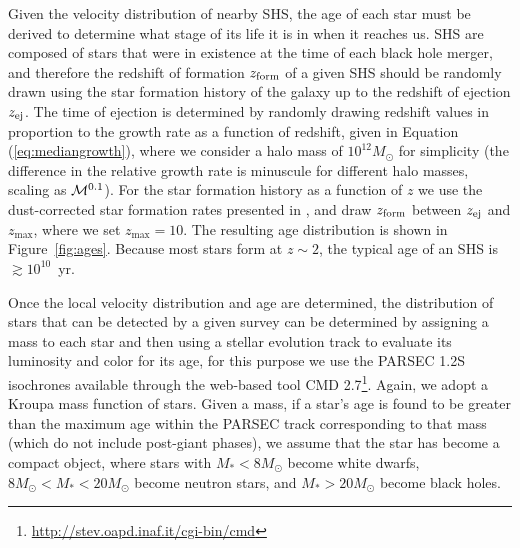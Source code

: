 \documentclass[a4paper,twocolumn]{emulateapj}
\begin{document}
{Given the velocity distribution of nearby SHS, the age of each star must be derived to determine what stage of its life it is in when it reaches us. SHS are composed of stars that were in existence at the time of each black hole merger, and therefore the redshift of formation $z_{\rm form}$ of a given SHS should be randomly drawn using the star formation history of the galaxy up to the redshift of ejection $z_{\rm ej}$. The time of ejection is determined by randomly drawing redshift values in proportion to the growth rate as a function of redshift, given in Equation (\ref{eq:mediangrowth}), where we consider a halo mass of $10^{12} M_{\odot}$ for simplicity (the difference in the relative growth rate is minuscule for different halo masses, scaling as ${\cal M}^{0.1}$). For the star formation history as a function of $z$ we use the dust-corrected star formation rates presented in \citet{Bouwens:2012a}, and draw $z_{\rm form}$ between $z_{\rm ej}$ and $z_{\max}$, where we set $z_{\max} = 10$. The resulting age distribution is shown in Figure~\ref{fig:ages}. Because most stars form at $z \sim 2$, the typical age of an SHS is $\gtrsim 10^{10}$~yr.

Once the local velocity distribution and age are determined, the distribution of stars that can be detected by a given survey can be determined by assigning a mass to each star and then using a stellar evolution track to evaluate its luminosity and color for its age, for this purpose we use the \mbox{PARSEC} 1.2S isochrones \citep{Bressan:2012a,Chen:2014a} available through the web-based tool CMD 2.7\footnote{\url{http://stev.oapd.inaf.it/cgi-bin/cmd}}. Again, we adopt a Kroupa mass function of stars. Given a mass, if a star's age is found to be greater than the maximum age within the PARSEC track corresponding to that mass (which do not include post-giant phases), we assume that the star has become a compact object, where stars with $M_{\ast} < 8 M_{\odot}$ become white dwarfs, $8 M_{\odot} < M_{\ast} < 20 M_{\odot}$ become neutron stars, and $M_{\ast} > 20 M_{\odot}$ become black holes.

}
\end{document}
